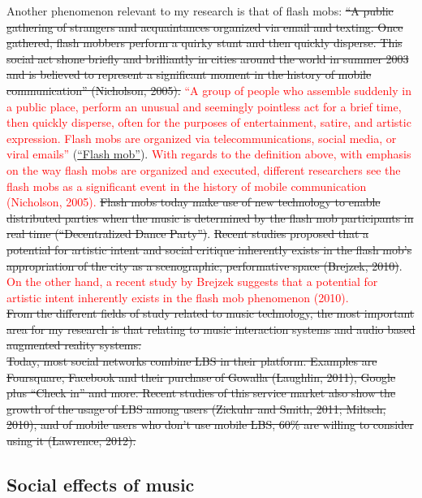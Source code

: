 \documentclass[a4paper,11pt]{article}
\begin{document}
Another phenomenon relevant to my research is that of flash mobs: \st{``A public gathering of strangers and acquaintances organized via email and texting. Once gathered, flash mobbers perform a quirky stunt and then quickly disperse. This social act shone briefly and brilliantly in cities around the world in summer 2003 and is believed to represent a significant moment in the history of mobile communication'' (Nicholson, 2005).} \textcolor{red}{``A group of people who assemble suddenly in a public place, perform an unusual and seemingly pointless act for a brief time, then quickly disperse, often for the purposes of entertainment, satire, and artistic expression. Flash mobs are organized via telecommunications, social media, or viral emails''} (\href{http://en.wikipedia.org/wiki/Flash_mob}{``Flash mob''}). \textcolor{red}{With regards to the definition above, with emphasis on the way flash mobs are organized and executed, different researchers see the flash mobs as a significant event in the history of mobile communication (Nicholson, 2005).} \st{Flash mobs today make use of new technology to enable distributed parties when the music is determined by the flash mob participants in real time (``Decentralized Dance Party'')}. \st{Recent studies proposed that a potential for artistic intent and social critique inherently exists in the flash mob's appropriation of the city as a scenographic, performative space (Brejzek, 2010)}. \textcolor{red}{On the other hand, a recent study by Brejzek suggests that a potential for artistic intent inherently exists in the flash mob phenomenon (2010).}\\

\st{From the different fields of study related to music technology, the most important area for my research is that relating to music interaction systems and audio based augmented reality systems.}\\

\st{Today, most social networks combine LBS in their platform. Examples are Foursquare, Facebook and their purchase of Gowalla (Laughlin, 2011), Google plus ``Check in'' and more. Recent studies of this service market also show the growth of the usage of LBS among users (Zickuhr and Smith, 2011; Miltsch, 2010), and of mobile users who don't use mobile LBS, 60\% are willing to consider using it (Lawrence, 2012).}\\


\subsection{Social effects of music}
\end{document}
